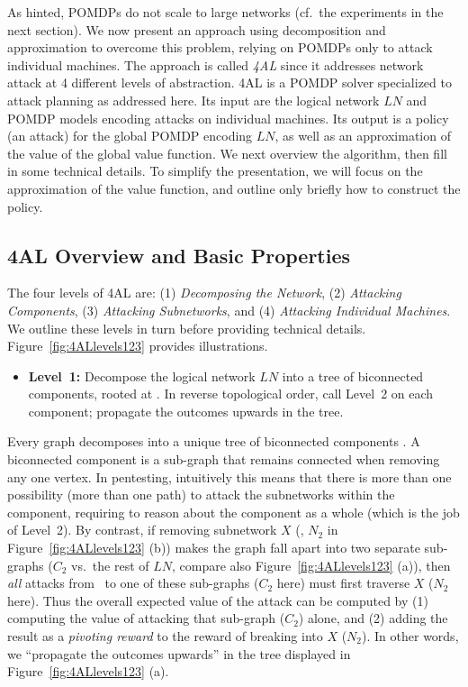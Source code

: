As hinted, POMDPs do not scale to large networks (cf.\ the experiments
in the next section). We now present an approach using decomposition
and approximation to overcome this problem, relying on POMDPs only to
attack individual machines. The approach is called \emph{4AL} since it
addresses network attack at 4 different levels of abstraction. 4AL is
a POMDP solver specialized to attack planning as addressed here. Its
input are the logical network $LN$ and POMDP models encoding attacks
on individual machines. Its output is a policy (an attack) for the
global POMDP encoding $LN$, as well as an approximation of the value
of the global value function. We next overview the algorithm, then
fill in some technical details. To simplify the presentation, we will
focus on the approximation of the value function, and outline only
briefly how to construct the policy.




\subsection{4AL Overview and Basic Properties}
\label{decomposition-algorithm:overview}


The four levels of 4AL are: (1) \emph{Decomposing the Network}, (2)
\emph{Attacking Components}, (3) \emph{Attacking Subnetworks}, and (4)
\emph{Attacking Individual Machines}. We outline these levels in
turn before providing technical details. Figure~\ref{fig:4ALlevels123} provides illustrations.

\vspace{-0.05cm}
\begin{itemize}
\item \textbf{Level~1:} Decompose the logical network $LN$ into a tree
  of biconnected components, rooted at \start. In reverse topological
  order, call Level~2 on each component; propagate the outcomes
  upwards in the tree.
\end{itemize}
\vspace{-0.05cm}

Every graph decomposes into a unique tree of biconnected components
\cite{HopTar-cACM73}. A biconnected component is a sub-graph that
remains connected when removing any one vertex. In pentesting,
intuitively this means that there is more than one possibility (more
than one path) to attack the subnetworks within the component,
requiring to reason about the component as a whole (which is the job
of Level~2). By contrast, if removing subnetwork $X$ (\eg, $N_2$
in Figure~\ref{fig:4ALlevels123} (b)) makes the graph fall apart into
two separate sub-graphs ($C_2$ vs.\ the rest of $LN$, compare also
Figure~\ref{fig:4ALlevels123} (a)), then \emph{all} attacks from
\start\ to one of these sub-graphs ($C_2$ here) must first traverse
$X$ ($N_2$ here). Thus the overall expected value of the attack can be
computed by (1) computing the value of attacking that sub-graph
($C_2$) alone, %
and (2) adding the result as a \emph{pivoting reward} to the reward of
breaking into $X$ ($N_2$). In other words, we ``propagate the outcomes
upwards'' in the tree displayed in Figure~\ref{fig:4ALlevels123}
(a). 


